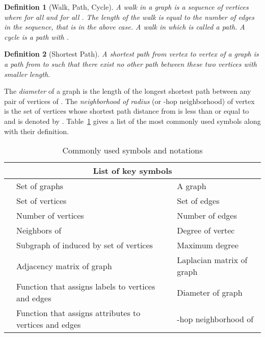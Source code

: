 \documentclass[twoside,11pt]{article}
\newtheorem{definition}{Definition}
\begin{document}
\begin{definition}[Walk, Path, Cycle]
    A walk in a graph  is a sequence of vertices  where  for all  and  for all .
    The length of the walk is equal to the number of edges in the sequence, that is  in the above case.
    A walk in which  is called a path.
    A cycle is a path with .
\end{definition}
\begin{definition}[Shortest Path]
    A shortest path from vertex  to vertex  of a graph  is a path from  to  such that there exist no other path between these two vertices with smaller length.
\end{definition}
The \textit{diameter} of a graph  is the length of the longest shortest path between any pair of vertices of .
The \textit{neighborhood of radius}  (or -hop neighborhood) of vertex  is the set of vertices whose shortest path distance from  is less than or equal to  and is denoted
by .
Table~\ref{tab:symbols} gives a list of the most commonly used symbols along with their definition.
\begin{table}[t]
  \centering
  \footnotesize
  \def\arraystretch{1.1}
  \begin{tabular}{llll} \hline
    \multicolumn{4}{c}{\textbf{List of key symbols}} \\ \hline
     & Set of graphs &  & A graph \\
     & Set of vertices &  & Set of edges \\
     & Number of vertices &  & Number of edges \\
     & Neighbors of  &  & Degree of vertec  \\
     & Subgraph of  induced by set of vertices  &  & Maximum degree \\
     & Adjacency matrix of graph &  & Laplacian matrix of graph \\
     & Function that assigns labels to vertices and edges &  & Diameter of graph \\ 
     & Function that assigns attributes to vertices and edges &  & -hop neighborhood of  \\ \hline
  \end{tabular}
  \caption{Commonly used symbols and notations}
  \label{tab:symbols}
\end{table}
\end{document}
